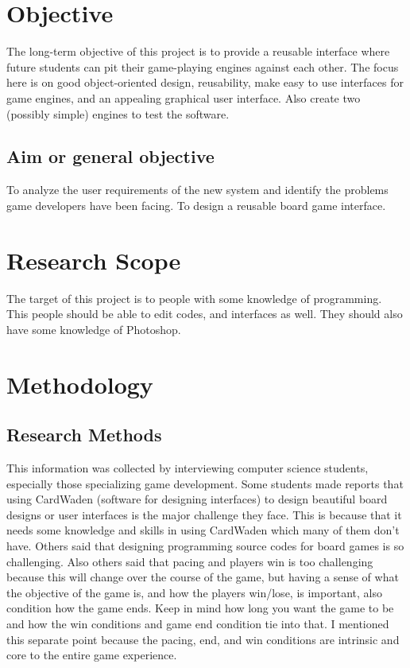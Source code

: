 \documentclass[a4paper,10pt]{article}
\begin{document}
\section{	Objective}
The long-term objective of this project is to provide a reusable interface where future students can pit their game-playing engines against each other. The focus here is on good object-oriented design, reusability, make easy to use interfaces for game engines, and an appealing graphical user interface. Also create two (possibly simple) engines to test the software.


\subsection{Aim or general objective}
To analyze the user requirements of the new system and identify the problems game developers have been facing. 
To design a reusable board game interface. 
\section{Research Scope}
The target of this project is to people with some knowledge of programming. 
This people should be able to edit codes, and interfaces as well. 
They should also have some knowledge of Photoshop.
	
\section{Methodology}
\subsection{Research Methods}
This information was collected by interviewing computer science students, especially those specializing game development. Some students made reports that using CardWaden (software for designing interfaces) to design beautiful board designs or user interfaces is the major challenge they face. This is because that it needs some knowledge and skills in using CardWaden which many of them don’t have. Others said that designing programming source codes for board games is so challenging.  Also others said that pacing and players win is too challenging because this will change over the course of the game, but having a sense of what the objective of the game is, and how the players win/lose, is important, also condition how the game ends. Keep in mind how long you want the game to be and how the win conditions and game end condition tie into that. I mentioned this separate point because the pacing, end, and win conditions are intrinsic and core to the entire game experience.

\begin{thebibliography}{1}
\end{thebibliography}
\end{document}

